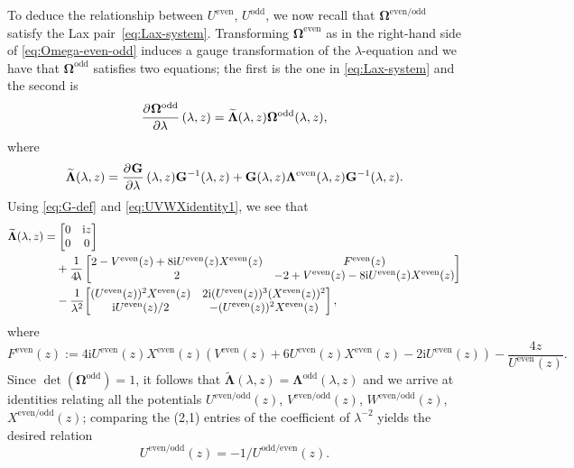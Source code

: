 \documentclass[pdftex]{sigma}
\numberwithin{equation}{section}
\newcommand{\ii}{\mathrm{i}}
\begin{document}
To deduce the relationship between $U^{\mathrm{even}}$, $U^{\mathrm{odd}}$, we now recall that $\mathbf{\Omega}^{\mathrm{even/odd}}$ satisfy the Lax pair~\eqref{eq:Lax-system}. Transforming $\mathbf{\Omega}^{\mathrm{even}}$ as in the right-hand side of \eqref{eq:Omega-even-odd} induces a gauge transformation of the $\lambda$-equation and we have that $\mathbf{\Omega}^{\mathrm{odd}}$ satisfies two equations; the first is the one in \eqref{eq:Lax-system} and the second is
\[
\dpd{\mathbf{\Omega}^{\mathrm{odd}}}{\lambda}(\lambda, z) = \widetilde{\mathbf{\Lambda}}(\lambda, z) \mathbf{\Omega}^{\mathrm{odd}}(\lambda, z),
\]
where
\[
\widetilde{\mathbf{\Lambda}}(\lambda, z) = \dpd{\mathbf{G}}{\lambda}(\lambda, z) \mathbf{G}^{-1}(\lambda, z) + \mathbf{G}(\lambda, z) \mathbf{\Lambda}^{\mathrm{even}}(\lambda, z)\mathbf{G}^{-1}(\lambda, z).
\]
Using \eqref{eq:G-def} and \eqref{eq:UVWXidentity1}, we see that
\begin{align*}
& \widetilde{\mathbf{\Lambda}}(\lambda, z) = \begin{bmatrix} 0 & \ii z \\ 0 & 0 \end{bmatrix}\\
 & \hphantom{\widetilde{\mathbf{\Lambda}}(\lambda, z) =}{}
 + \dfrac{1}{4 \!\lambda}\begin{bmatrix} 2 - V^{\mathrm{even}}(z) + 8\ii U^{\mathrm{even}}(z)X^{\mathrm{even}}(z) & F^\mathrm{even}(z) \\ 2 & -2 + V^{\mathrm{even}}(z) - 8\ii U^{\mathrm{even}}(z)X^{\mathrm{even}}(z) \end{bmatrix} \\
 & \hphantom{\widetilde{\mathbf{\Lambda}}(\lambda, z) =}{} -\dfrac{1}{\lambda^2} \!\begin{bmatrix} (U^{\mathrm{even}}(z))^2 X^{\mathrm{even}}(z) & 2\ii (U^{\mathrm{even}}(z))^3(X^{\mathrm{even}}(z))^2 \\ \ii U^{\mathrm{even}}(z)/2 & - (U^{\mathrm{even}}(z))^2 X^{\mathrm{even}}(z)\end{bmatrix},
\end{align*}
where
\[
F^\mathrm{even}(z) := 4\ii U^{\mathrm{even}}(z) X^{\mathrm{even}}(z) \left(V^{\mathrm{even}}(z) + 6 U^{\mathrm{even}}(z) X^{\mathrm{even}}(z)-2 \ii U^{\mathrm{even}}(z) \right)- \dfrac{4z}{ U^{\mathrm{even}}(z)}.
\]
Since $\det(\mathbf{\Omega}^\mathrm{odd}) = 1$, it follows that $\widetilde{\mathbf{\Lambda}}(\lambda, z) = \mathbf{\Lambda}^{\mathrm{odd}}(\lambda, z)$ and we arrive at identities relating all the potentials $U^{\mathrm{even/odd}}(z)$, $V^{\mathrm{even/odd}}(z)$, $W^{\mathrm{even/odd}}(z)$, $X^{\mathrm{even/odd}}(z)$; comparing the (2,1) entries of the coefficient of $\lambda^{-2}$ yields the desired relation
\[
U^{\mathrm{even/odd}}(z) = -1/U^{\mathrm{odd/even}}(z).
\]
\end{document}
